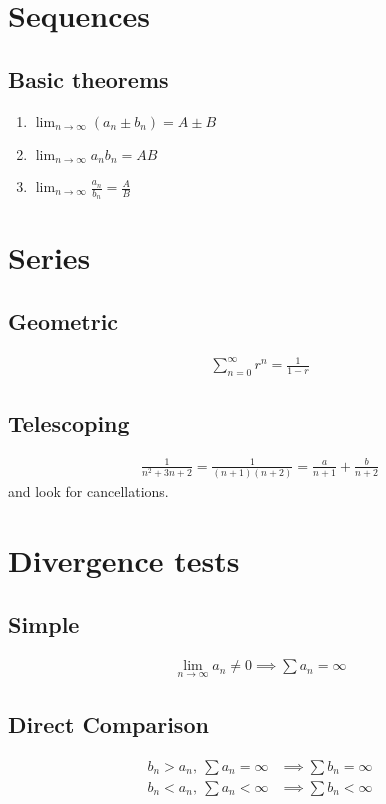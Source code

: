 \documentclass[12pt]{article}
\begin{document}
\begin{multicols}{2}
\section*{Sequences}

\subsection*{Basic theorems}
\begin{enumerate}
    \item $\lim_{n\to\infty} (a_n \pm b_n) = A \pm B$
    \item $\lim_{n\to\infty} a_n b_n = AB$
    \item $\lim_{n\to\infty} \frac{a_n}{b_n} = \frac{A}{B}$
\end{enumerate}



\section*{Series}

\subsection*{Geometric}
\begin{align*}
    \sum_{n=0}^\infty r^n = \frac{1}{1-r}
\end{align*}

\subsection*{Telescoping}
\begin{align*}
    \frac{1}{n^2 + 3n + 2} = \frac{1}{(n+1)(n+2)} = \frac{a}{n+1} + \frac{b}{n+2}
\end{align*}
and look for cancellations.



\section*{Divergence tests}

\subsection*{Simple}
\begin{align*}
    \lim_{n\to\infty} a_n \neq 0 \implies \sum a_n = \infty
\end{align*}

\subsection*{Direct Comparison}
\begin{align*}
    b_n > a_n,\ \sum a_n = \infty &\implies \sum b_n = \infty \\
    b_n < a_n,\ \sum a_n < \infty &\implies \sum b_n < \infty
\end{align*}


\end{multicols}
\end{document}
